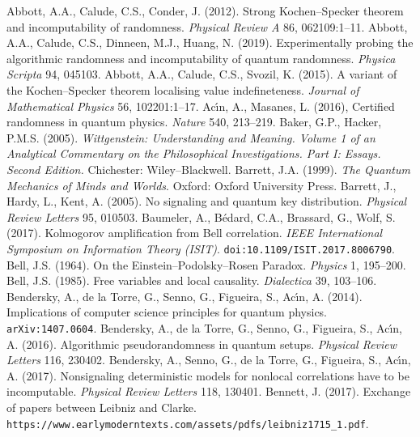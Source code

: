 \documentclass[11pt,a4paper]{article}
\numberwithin{equation}{section}
\begin{document}
  \newpage
{}
\begin{small}
\begin{thebibliography}{99}
  \bibitem{}  Abbott, A.A.,  Calude, C.S.,  Conder, J.  (2012). Strong Kochen--Specker theorem 
  and incomputability of randomness. \emph{Physical Review A} 86, 062109:1--11.  
\bibitem{}  Abbott, A.A.,  Calude, C.S.,  Dinneen, M.J.,  Huang, N. (2019). 
 Experimentally probing the algorithmic randomness and incomputability of quantum randomness. \emph{Physica Scripta}
 94, 045103. 
 \bibitem{}  Abbott, A.A.,  Calude, C.S.,  Svozil, K. (2015). A variant of the Kochen--Specker theorem localising value  indefineteness. \emph{Journal of Mathematical Physics} 56, 102201:1--17.  
\bibitem{}   Ac\'{\i}n, A.,   Masanes, L. (2016), Certified randomness in quantum physics. \emph{Nature}   540,  213--219.
\bibitem{} Baker, G.P.,  Hacker, P.M.S. (2005). \emph{
Wittgenstein: Understanding and Meaning. Volume 1 of an Analytical Commentary on the Philosophical Investigations. Part I: Essays. Second Edition.} Chichester: Wiley--Blackwell. 
\bibitem{} Barrett, J.A. (1999). \emph{The Quantum Mechanics of Minds and Worlds}. Oxford: Oxford University Press. 
\bibitem{} Barrett, J.,  Hardy, L.,  Kent, A. (2005). No signaling and quantum key distribution. \emph{Physical Review Letters}
 95, 010503.
\bibitem{}    Baumeler, A.,  B\'{e}dard, C.A.,  Brassard, G.,  Wolf, S. (2017). Kolmogorov amplification from Bell correlation. 
\emph{IEEE International Symposium on Information Theory (ISIT)}. \texttt{doi:10.1109/ISIT.2017.8006790}. 
\bibitem{}
Bell, J.S. (1964). On the Einstein--Podolsky--Rosen Paradox. \emph{Physics} 1,  195--200.
\bibitem{}  Bell, J.S. (1985). Free variables and local causality. \emph{Dialectica} 39, 103--106.  
\bibitem{}   Bendersky, A.,  de la Torre, G.,  Senno, G.,  Figueira, S., Ac\'{\i}n, A. (2014). Implications of computer science principles for quantum physics. \texttt{arXiv:1407.0604}.
\bibitem{}   Bendersky, A., de la Torre, G.,  Senno, G.,   Figueira, S., Ac\'{\i}n, A. (2016).
Algorithmic pseudorandomness in quantum setups. \emph{Physical Review Letters} 116, 230402.
\bibitem{}   Bendersky, A.,   Senno, G., de la Torre, G.,  Figueira, S., Ac\'{\i}n, A. (2017).
Nonsignaling deterministic models for nonlocal correlations have to be incomputable. \emph{Physical Review Letters}
118, 130401.
\bibitem{}  Bennett, J. (2017). Exchange of papers between Leibniz and Clarke.\\
 \verb#https://www.earlymoderntexts.com/assets/pdfs/leibniz1715_1.pdf#.

\end{thebibliography}
\end{small}
\end{document}
